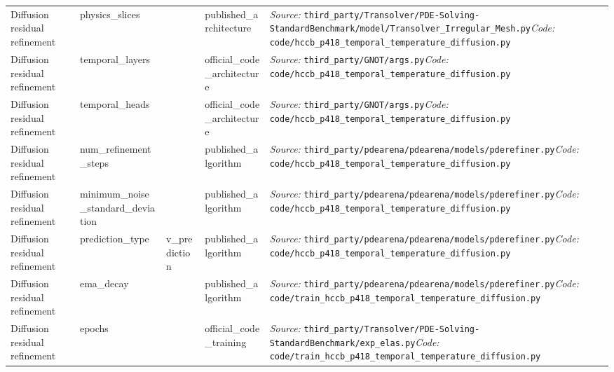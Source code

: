 \begin{longtable}{>{\raggedright\arraybackslash}p{2.7cm}>{\raggedright\arraybackslash}p{3.2cm}>{\raggedright\arraybackslash}p{1.5cm}>{\raggedright\arraybackslash}p{2.6cm}>{\raggedright\arraybackslash}p{8.0cm}}
Diffusion residual refinement & physics\_\allowbreak{}slices & 32 & published\_\allowbreak{}architecture & \textit{Source:} \nolinkurl{third_party/Transolver/PDE-Solving-StandardBenchmark/model/Transolver_Irregular_Mesh.py}\newline \textit{Code:} \nolinkurl{code/hccb_p418_temporal_temperature_diffusion.py} \\
Diffusion residual refinement & temporal\_\allowbreak{}layers & 3 & official\_\allowbreak{}code\_\allowbreak{}architecture & \textit{Source:} \nolinkurl{third_party/GNOT/args.py}\newline \textit{Code:} \nolinkurl{code/hccb_p418_temporal_temperature_diffusion.py} \\
Diffusion residual refinement & temporal\_\allowbreak{}heads & 1 & official\_\allowbreak{}code\_\allowbreak{}architecture & \textit{Source:} \nolinkurl{third_party/GNOT/args.py}\newline \textit{Code:} \nolinkurl{code/hccb_p418_temporal_temperature_diffusion.py} \\
Diffusion residual refinement & num\_\allowbreak{}refinement\_\allowbreak{}steps & 3 & published\_\allowbreak{}algorithm & \textit{Source:} \nolinkurl{third_party/pdearena/pdearena/models/pderefiner.py}\newline \textit{Code:} \nolinkurl{code/hccb_p418_temporal_temperature_diffusion.py} \\
Diffusion residual refinement & minimum\_\allowbreak{}noise\_\allowbreak{}standard\_\allowbreak{}deviation & 0.0000004 & published\_\allowbreak{}algorithm & \textit{Source:} \nolinkurl{third_party/pdearena/pdearena/models/pderefiner.py}\newline \textit{Code:} \nolinkurl{code/hccb_p418_temporal_temperature_diffusion.py} \\
Diffusion residual refinement & prediction\_\allowbreak{}type & v\_\allowbreak{}prediction & published\_\allowbreak{}algorithm & \textit{Source:} \nolinkurl{third_party/pdearena/pdearena/models/pderefiner.py}\newline \textit{Code:} \nolinkurl{code/hccb_p418_temporal_temperature_diffusion.py} \\
Diffusion residual refinement & ema\_\allowbreak{}decay & 0.995 & published\_\allowbreak{}algorithm & \textit{Source:} \nolinkurl{third_party/pdearena/pdearena/models/pderefiner.py}\newline \textit{Code:} \nolinkurl{code/train_hccb_p418_temporal_temperature_diffusion.py} \\
Diffusion residual refinement & epochs & 500 & official\_\allowbreak{}code\_\allowbreak{}training & \textit{Source:} \nolinkurl{third_party/Transolver/PDE-Solving-StandardBenchmark/exp_elas.py}\newline \textit{Code:} \nolinkurl{code/train_hccb_p418_temporal_temperature_diffusion.py} \\

\end{longtable}
